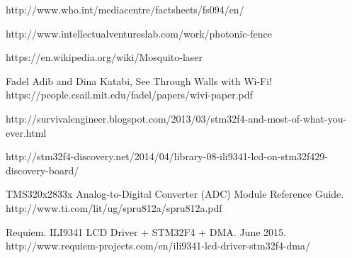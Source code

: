 \documentclass[twoside]{article}
\begin{document}
\begin{multicols}{2}

\begin{thebibliography}{99} %

 http://www.who.int/mediacentre/factsheets/fs094/en/

 http://www.intellectualventureslab.com/work/photonic-fence

 https://en.wikipedia.org/wiki/Mosquito-laser

 Fadel Adib and Dina Katabi, See Through Walls with Wi-Fi! https://people.csail.mit.edu/fadel/papers/wivi-paper.pdf 

 http://survivalengineer.blogspot.com/2013/03/stm32f4-and-most-of-what-you-ever.html

 http://stm32f4-discovery.net/2014/04/library-08-ili9341-lcd-on-stm32f429-discovery-board/

 TMS320x2833x Analog-to-Digital Converter
(ADC) Module Reference Guide. http://www.ti.com/lit/ug/spru812a/spru812a.pdf

 Requiem. ILI9341 LCD Driver + STM32F4 + DMA. June 2015. http://www.requiem-projects.com/en/ili9341-lcd-driver-stm32f4-dma/





\end{thebibliography}


\end{multicols}
\end{document}

